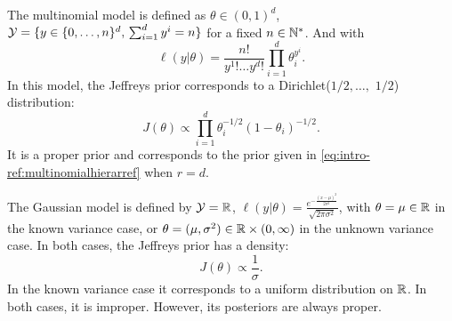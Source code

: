 \begin{ex}
    The multinomial model is defined as $\theta\in(0,1)^d$, $\mathcal{Y}=\{y\in\{0,\dots,n\}^d,\,\sum_{i=1}^dy^i=n\} $ for a fixed $n\in\mathbb{N}^\ast$.
    And with 
        \begin{equation}
            \ell(y|\theta) = \frac{n!}{y^1!\dots y^d!}\prod_{i=1}^d\theta_i^{y^i}.
        \end{equation}
    In this model, the Jeffreys prior corresponds to a Dirichlet($1/2,\dots,$ $1/2$) distribution:
        \begin{equation}
            J(\theta)\propto \prod_{i=1}^d\theta_i^{-1/2}(1-\theta_i)^{-1/2}.
        \end{equation}
    It is a proper prior and corresponds to the prior given in \cref{eq:intro-ref:multinomialhierarref} when $r=d$.  
\end{ex}

\begin{ex}
    The Gaussian model is defined by $\mathcal{Y}=\mathbb{R}$, $\ell(y|\theta) = \frac{e^{-\frac{(x-\mu)^2}{2\sigma^2}}}{\sqrt{2\pi\sigma^2}} $, with $\theta=\mu\in\mathbb{R} $ in the known variance case, or $\theta=(\mu,\sigma^2)\in\mathbb{R}\times(0,\infty) $ in the unknown variance case.
    In both cases, the Jeffreys prior has a density:
        \begin{equation}
            J(\theta)\propto \frac{1}{\sigma}.
        \end{equation}    
    In the known variance case it corresponds to a uniform distribution on $\mathbb{R}$. In both cases, it is improper.  However, its posteriors are always proper.
\end{ex}




